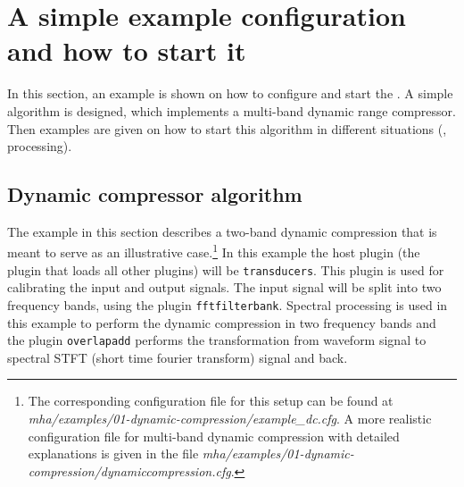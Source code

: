 
\section{A simple example configuration and how to start it}%
\label{sec:scenarios}%
%
%
%

In this section, an example is shown on how to configure and start the
\mha{}. A simple algorithm is designed, which implements a 
multi-band dynamic range compressor. Then examples are given on
how to start this algorithm in different situations (\mhad{}, \Matlab{} processing).

\subsection{Dynamic compressor algorithm}%
\label{sec:dyncmp}%

The example in this section describes a two-band dynamic compression
that is meant to serve as an illustrative case.\footnote{
  The corresponding configuration file for this setup can be found at
  \emph{mha/examples/01-dynamic-compression/example\_dc.cfg}.
  A more realistic configuration file for multi-band dynamic compression
  with detailed explanations is given in the file
  \emph{mha/examples/01-dynamic-compression/dynamiccompression.cfg}.
}
%
In this example the host plugin (the plugin that loads all other
plugins) will be \verb!transducers!.
%
This plugin is used for calibrating the input and output signals.
%
The input signal will be split into two frequency bands, using the
\mha{} plugin \verb!fftfilterbank!.
%
Spectral processing is used in this example to perform the dynamic
compression in two frequency bands and the \mha{} plugin
\verb!overlapadd! performs the transformation from waveform signal to
spectral STFT (short time fourier transform) signal and back.

